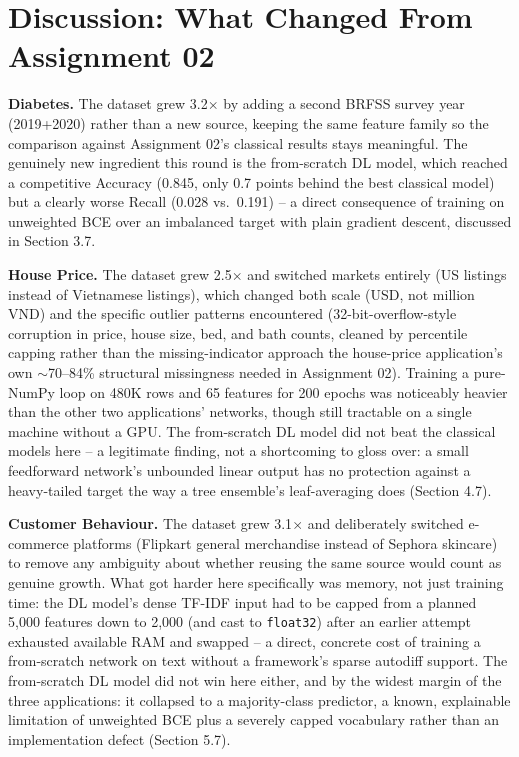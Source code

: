 \documentclass[11pt, a4paper]{article}
\begin{document}
\section{Discussion: What Changed From Assignment 02}

\textbf{Diabetes.} The dataset grew 3.2$\times$ by adding a second BRFSS survey year
(2019+2020) rather than a new source, keeping the same feature family so the comparison
against Assignment 02's classical results stays meaningful. The genuinely new ingredient
this round is the from-scratch DL model, which reached a competitive Accuracy (0.845, only
0.7 points behind the best classical model) but a clearly worse Recall (0.028 vs.\ 0.191)
-- a direct consequence of training on unweighted BCE over an imbalanced target with plain
gradient descent, discussed in Section 3.7.

\textbf{House Price.} The dataset grew 2.5$\times$ and switched markets entirely (US
listings instead of Vietnamese listings), which changed both scale (USD, not million VND)
and the specific outlier patterns encountered (32-bit-overflow-style corruption in price,
house size, bed, and bath counts, cleaned by percentile capping rather than the
missing-indicator approach the house-price application's own $\sim$70--84\% structural
missingness needed in Assignment 02). Training a pure-NumPy loop on 480K rows and 65
features for 200 epochs was noticeably heavier than the other two applications' networks, though still
tractable on a single machine without a GPU. The from-scratch DL model did not beat the
classical models here -- a legitimate finding, not a shortcoming to gloss over: a small
feedforward network's unbounded linear output has no protection against a heavy-tailed
target the way a tree ensemble's leaf-averaging does (Section 4.7).

\textbf{Customer Behaviour.} The dataset grew 3.1$\times$ and deliberately switched
e-commerce platforms (Flipkart general merchandise instead of Sephora skincare) to remove
any ambiguity about whether reusing the same source would count as genuine growth. What got
harder here specifically was memory, not just training time: the DL model's dense TF-IDF
input had to be capped from a planned 5,000 features down to 2,000 (and cast to
\texttt{float32}) after an earlier attempt exhausted available RAM and swapped -- a direct,
concrete cost of training a from-scratch network on text without a framework's sparse
autodiff support. The from-scratch DL model did not win here either, and by the widest
margin of the three applications: it collapsed to a majority-class predictor, a known,
explainable limitation of unweighted BCE plus a severely capped vocabulary rather than an
implementation defect (Section 5.7).
\end{document}
